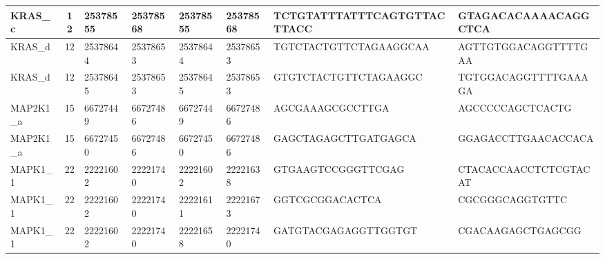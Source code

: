\begin{landscape}
\begin{longtable}{| p{} | p{} | p{} | p{} | p{} | p{} | p{} | p{} |}
\multicolumn{1}{|l|}{KRAS\_c}    & \multicolumn{1}{c|}{12} & \multicolumn{1}{l|}{25378555}  & \multicolumn{1}{l|}{25378568}  & \multicolumn{1}{l|}{25378555}  & \multicolumn{1}{l|}{25378568}  & \multicolumn{1}{l|}{TCTGTATTTATTTCAGTGTTACTTACC}     & \multicolumn{1}{l|}{GTAGACACAAAACAGGCTCA}          \\ \hline
\multicolumn{1}{|l|}{KRAS\_d}    & \multicolumn{1}{c|}{12} & \multicolumn{1}{l|}{25378644}  & \multicolumn{1}{l|}{25378653}  & \multicolumn{1}{l|}{25378644}  & \multicolumn{1}{l|}{25378653}  & \multicolumn{1}{l|}{TGTCTACTGTTCTAGAAGGCAA}          & \multicolumn{1}{l|}{AGTTGTGGACAGGTTTTGAA}          \\ \hline
\multicolumn{1}{|l|}{KRAS\_d}    & \multicolumn{1}{c|}{12} & \multicolumn{1}{l|}{25378645}  & \multicolumn{1}{l|}{25378653}  & \multicolumn{1}{l|}{25378645}  & \multicolumn{1}{l|}{25378653}  & \multicolumn{1}{l|}{GTGTCTACTGTTCTAGAAGGC}           & \multicolumn{1}{l|}{TGTGGACAGGTTTTGAAAGA}          \\ \hline
\multicolumn{1}{|l|}{MAP2K1\_a}  & \multicolumn{1}{c|}{15} & \multicolumn{1}{l|}{66727449}  & \multicolumn{1}{l|}{66727486}  & \multicolumn{1}{l|}{66727449}  & \multicolumn{1}{l|}{66727486}  & \multicolumn{1}{l|}{AGCGAAAGCGCCTTGA}                & \multicolumn{1}{l|}{AGCCCCCAGCTCACTG}              \\ \hline
\multicolumn{1}{|l|}{MAP2K1\_a}  & \multicolumn{1}{c|}{15} & \multicolumn{1}{l|}{66727450}  & \multicolumn{1}{l|}{66727486}  & \multicolumn{1}{l|}{66727450}  & \multicolumn{1}{l|}{66727486}  & \multicolumn{1}{l|}{GAGCTAGAGCTTGATGAGCA}            & \multicolumn{1}{l|}{GGAGACCTTGAACACCACA}           \\ \hline
\multicolumn{1}{|l|}{MAPK1\_1}   & \multicolumn{1}{c|}{22} & \multicolumn{1}{l|}{22221602}  & \multicolumn{1}{l|}{22221740}  & \multicolumn{1}{l|}{22221602}  & \multicolumn{1}{l|}{22221638}  & \multicolumn{1}{l|}{GTGAAGTCCGGGTTCGAG}              & \multicolumn{1}{l|}{CTACACCAACCTCTCGTACAT}         \\ \hline
\multicolumn{1}{|l|}{MAPK1\_1}   & \multicolumn{1}{c|}{22} & \multicolumn{1}{l|}{22221602}  & \multicolumn{1}{l|}{22221740}  & \multicolumn{1}{l|}{22221611}  & \multicolumn{1}{l|}{22221673}  & \multicolumn{1}{l|}{GGTCGCGGACACTCA}                 & \multicolumn{1}{l|}{CGCGGGCAGGTGTTC}               \\ \hline
\multicolumn{1}{|l|}{MAPK1\_1}   & \multicolumn{1}{c|}{22} & \multicolumn{1}{l|}{22221602}  & \multicolumn{1}{l|}{22221740}  & \multicolumn{1}{l|}{22221658}  & \multicolumn{1}{l|}{22221740}  & \multicolumn{1}{l|}{GATGTACGAGAGGTTGGTGT}            & \multicolumn{1}{l|}{CGACAAGAGCTGAGCGG}             \\ \hline

\end{longtable}
\end{landscape}
